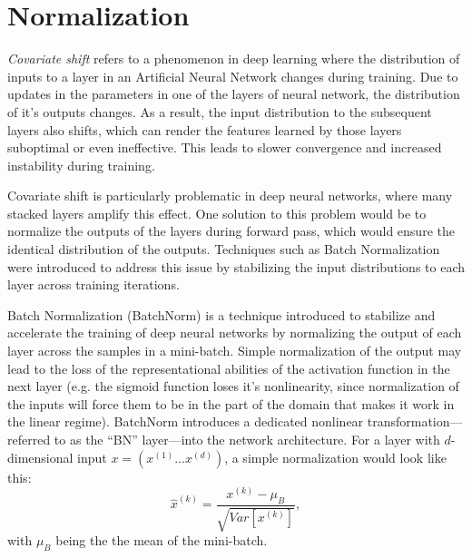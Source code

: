 \section{Normalization}
\label{subsec:normalization}

\begin{definition}
  \textit{Covariate shift} \autocite{ioffe2015batch} refers to a phenomenon in deep learning where the distribution of inputs to a layer in an Artificial Neural Network changes during training. Due to updates in the parameters in one of the layers of neural network, the distribution of it's outputs changes. As a result, the input distribution to the subsequent layers also shifts, which can render the features learned by those layers suboptimal or even ineffective. This leads to slower convergence and increased instability during training.
\end{definition}

Covariate shift is particularly problematic in deep neural networks, where many stacked layers amplify this effect. One solution to this problem would be to normalize the outputs of the layers during forward pass, which would ensure the identical distribution of the outputs. Techniques such as Batch Normalization \autocite{ioffe2015batch} were introduced to address this issue by stabilizing the input distributions to each layer across training iterations.

Batch Normalization (BatchNorm) \autocite{ioffe2015batch} is a technique introduced to stabilize and accelerate the training of deep neural networks by normalizing the output of each layer across the samples in a mini-batch. Simple normalization of the output may lead to the loss of the representational abilities of the activation function in the next layer (e.g. the sigmoid function loses it's nonlinearity, since normalization of the inputs will force them to be in the part of the domain that makes it work in the linear regime). BatchNorm introduces a dedicated nonlinear transformation—referred to as the “BN” layer—into the network architecture. For a layer with $d$-dimensional input $x = (x^{(1)}...x^{(d)})$, a simple normalization would look like this:
\[
  \hat{x}^{(k)} = \frac{x^{(k)} - \mu_B}{\sqrt{Var[x^{(k)}]}},
\]
with $\mu_B$ being the the mean of the mini-batch.

